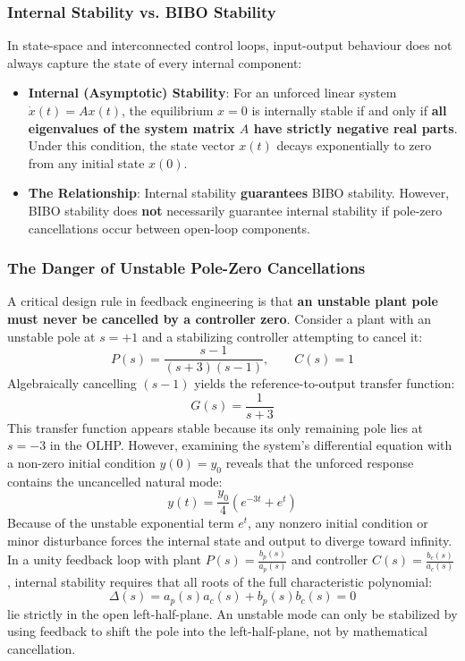 \documentclass[12pt,onecolumn,twoside ]{article}
\begin{document}
	\subsubsection{Internal Stability vs. BIBO Stability}
	In state-space and interconnected control loops, input-output behaviour does not always capture the state of every internal component:
	\begin{itemize}
		\item
		\textbf{Internal (Asymptotic) Stability}: For an unforced linear system $\dot{x}(t) = Ax(t)$, the equilibrium $x = 0$ is internally stable if and only if \textbf{all eigenvalues of the system matrix $A$ have strictly negative real parts}. Under this condition, the state vector $x(t)$ decays exponentially to zero from any initial state $x(0)$.
		\item
		\textbf{The Relationship}: Internal stability \textbf{guarantees} BIBO stability. However, BIBO stability does \textbf{not} necessarily guarantee internal stability if pole-zero cancellations occur between open-loop components.
	\end{itemize}
	\subsubsection{The Danger of Unstable Pole-Zero Cancellations}
	A critical design rule in feedback engineering is that \textbf{an unstable plant pole must never be cancelled by a controller zero}.
	Consider a plant with an unstable pole at $s = +1$ and a stabilizing controller attempting to cancel it: \[
	P(s) = \frac{s - 1}{(s + 3)(s - 1)}, \qquad C(s) = 1
	\]
	Algebraically cancelling $(s - 1)$ yields the reference-to-output transfer function: \[
	G(s) = \frac{1}{s + 3}
	\] This transfer function appears stable because its only remaining pole lies at $s = -3$ in the OLHP. However, examining the system's differential equation with a non-zero initial condition $y(0) = y_0$ reveals that the unforced response contains the uncancelled natural mode: \[
	y(t) = \frac{y_0}{4}\left( e^{-3t} + e^{t} \right)
	\] Because of the unstable exponential term $e^t$, any nonzero initial condition or minor disturbance forces the internal state and output to diverge toward infinity. In a unity feedback loop with plant $P(s) = \frac{b_p(s)}{a_p(s)}$ and controller $C(s) = \frac{b_c(s)}{a_c(s)}$, internal stability requires that all roots of the full characteristic polynomial: \[
	\Delta(s) = a_p(s)a_c(s) + b_p(s)b_c(s) = 0
	\] lie strictly in the open left-half-plane. An unstable mode can only be stabilized by using feedback to shift the pole into the left-half-plane, not by mathematical cancellation.
	
\end{document}
